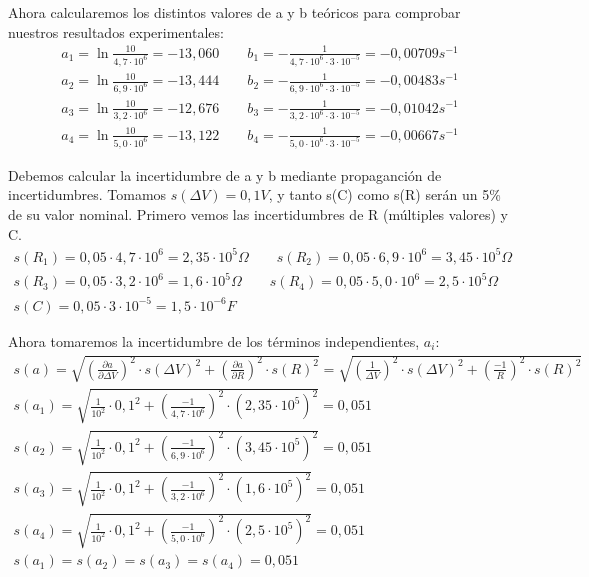 \documentclass[12pt, a4paper, titlepage]{article}
\begin{document}
  Ahora calcularemos los distintos valores de a y b teóricos para comprobar nuestros resultados experimentales:
  \begin{gather*}
    a_1 = \ln{\frac{10}{4,7 \cdot 10^6}} = -13,060 \qquad b_1 = - \frac{1}{4,7 \cdot 10^6 \cdot 3 \cdot 10^{-5}} = -0,00709 s^{-1} \\
    a_2 = \ln{\frac{10}{6,9 \cdot 10^6}} = -13,444 \qquad b_2 = - \frac{1}{6,9 \cdot 10^6 \cdot 3 \cdot 10^{-5}} = -0,00483 s^{-1} \\
    a_3 = \ln{\frac{10}{3,2 \cdot 10^6}} = -12,676 \qquad b_3 = - \frac{1}{3,2 \cdot 10^6 \cdot 3 \cdot 10^{-5}} = -0,01042 s^{-1} \\
    a_4 = \ln{\frac{10}{5,0 \cdot 10^6}} = -13,122 \qquad b_4 = - \frac{1}{5,0 \cdot 10^6 \cdot 3 \cdot 10^{-5}} = -0,00667 s^{-1}
  \end{gather*}

  Debemos calcular la incertidumbre de a y b mediante propaganción de incertidumbres. Tomamos $s(\Delta V) = 0,1V$, y tanto s(C) como s(R) serán un 5\% de su valor nominal. Primero vemos las incertidumbres de R (múltiples valores) y C.
  \begin{gather}
    s(R_1) = 0,05 \cdot 4,7 \cdot 10^6 = 2,35 \cdot 10^5 \Omega \qquad s(R_2) = 0,05 \cdot 6,9 \cdot 10^6 = 3,45 \cdot 10^5 \Omega \nonumber \\
    s(R_3) = 0,05 \cdot 3,2 \cdot 10^6 = 1,6 \cdot 10^5 \Omega \qquad s(R_4) = 0,05 \cdot 5,0 \cdot 10^6 = 2,5 \cdot 10^5 \Omega \nonumber \\
    s(C) = 0,05 \cdot 3 \cdot 10^{-5} = 1,5 \cdot 10^{-6} F \nonumber
  \end{gather}

  Ahora tomaremos la incertidumbre de los términos independientes, $a_i$:
  \begin{gather}
    s(a) = \sqrt{\left(\frac{\partial a}{\partial \Delta V}\right)^2 \cdot s(\Delta V)^2 + \left(\frac{\partial a}{\partial R}\right)^2 \cdot s(R)^2} = \sqrt{\left(\frac{1}{\Delta V}\right)^2 \cdot s(\Delta V)^2 + \left(\frac{-1}{R}\right)^2 \cdot s(R)^2} \label{ec:sateo} \\
    s(a_1) = \sqrt{\frac{1}{10^2} \cdot 0,1^2 + \left(\frac{-1}{4,7 \cdot 10^6}\right)^2 \cdot (2,35 \cdot 10^5)^2} = 0,051 \nonumber \\
    s(a_2) = \sqrt{\frac{1}{10^2} \cdot 0,1^2 + \left(\frac{-1}{6,9 \cdot 10^6}\right)^2 \cdot (3,45 \cdot 10^5)^2} = 0,051 \nonumber \\
    s(a_3) = \sqrt{\frac{1}{10^2} \cdot 0,1^2 + \left(\frac{-1}{3,2 \cdot 10^6}\right)^2 \cdot (1,6 \cdot 10^5)^2} = 0,051 \nonumber \\
    s(a_4) = \sqrt{\frac{1}{10^2} \cdot 0,1^2 + \left(\frac{-1}{5,0 \cdot 10^6}\right)^2 \cdot (2,5 \cdot 10^5)^2} = 0,051 \nonumber \\
    s(a_1) = s(a_2) = s(a_3) = s(a_4) = 0,051 \nonumber
  \end{gather}
\end{document}
